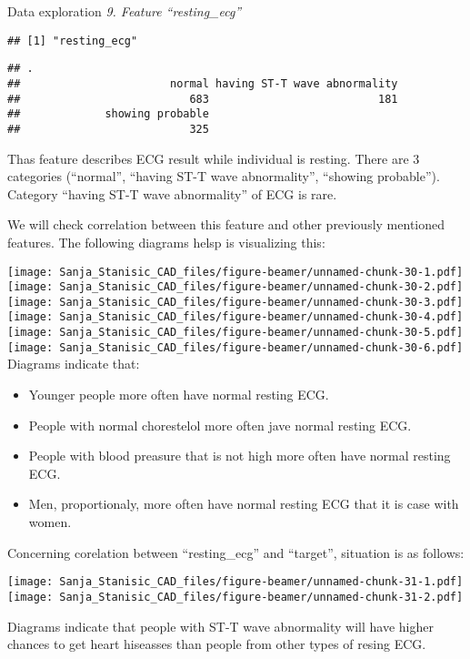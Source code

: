 \documentclass[
  ignorenonframetext,
]{beamer}
\begin{document}
\begin{frame}[fragile]{Data exploration}
\emph{9. Feature ``resting\_ecg''}

\begin{verbatim}
## [1] "resting_ecg"
\end{verbatim}

\begin{verbatim}
## .
##                       normal having ST-T wave abnormality 
##                          683                          181 
##             showing probable 
##                          325
\end{verbatim}

Thas feature describes ECG result while individual is resting. There are
3 categories (``normal'', ``having ST-T wave abnormality'', ``showing
probable''). Category ``having ST-T wave abnormality'' of ECG is rare.

We will check correlation between this feature and other previously
mentioned features. The following diagrams helsp is visualizing this:

\texttt{[image: Sanja\_Stanisic\_CAD\_files/figure-beamer/unnamed-chunk-30-1.pdf]}
\texttt{[image: Sanja\_Stanisic\_CAD\_files/figure-beamer/unnamed-chunk-30-2.pdf]}
\texttt{[image: Sanja\_Stanisic\_CAD\_files/figure-beamer/unnamed-chunk-30-3.pdf]}
\texttt{[image: Sanja\_Stanisic\_CAD\_files/figure-beamer/unnamed-chunk-30-4.pdf]}
\texttt{[image: Sanja\_Stanisic\_CAD\_files/figure-beamer/unnamed-chunk-30-5.pdf]}
\texttt{[image: Sanja\_Stanisic\_CAD\_files/figure-beamer/unnamed-chunk-30-6.pdf]}
Diagrams indicate that:

\begin{itemize}
\item
  Younger people more often have normal resting ECG.
\item
  People with normal chorestelol more often jave normal resting ECG.
\item
  People with blood preasure that is not high more often have normal
  resting ECG.
\item
  Men, proportionaly, more often have normal resting ECG that it is case
  with women.
\end{itemize}

Concerning corelation between ``resting\_ecg'' and ``target'', situation
is as follows:

\texttt{[image: Sanja\_Stanisic\_CAD\_files/figure-beamer/unnamed-chunk-31-1.pdf]}
\texttt{[image: Sanja\_Stanisic\_CAD\_files/figure-beamer/unnamed-chunk-31-2.pdf]}

Diagrams indicate that people with ST-T wave abnormality will have
higher chances to get heart hiseasses than people from other types of
resing ECG.


\end{frame}
\end{document}
